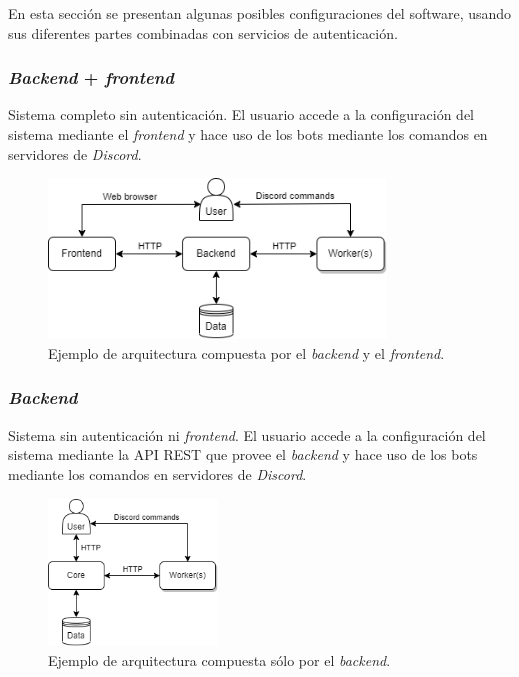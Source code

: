 En esta sección se presentan algunas posibles configuraciones del software, usando sus diferentes partes combinadas con servicios de autenticación.

\subsubsection{\textit{Backend} + \textit{frontend}}

Sistema completo sin autenticación. El usuario accede a la configuración del sistema mediante el \textit{frontend} y hace uso de los bots mediante los comandos en servidores de \textit{Discord}.

\begin{figure}[H]
	\centering
	\includegraphics[width=0.8\textwidth]{img/architecture_with_frontend.png}
	\caption{Ejemplo de arquitectura compuesta por el \textit{backend} y el \textit{frontend}.}
\end{figure}

\subsubsection{\textit{Backend}}

Sistema sin autenticación ni \textit{frontend}. El usuario accede a la configuración del sistema mediante la API REST que provee el \textit{backend} y hace uso de los bots mediante los comandos en servidores de \textit{Discord}.

\begin{figure}[H]
	\centering
	\includegraphics[width=0.4\textwidth]{img/architecture_without_frontend.png}
	\caption{Ejemplo de arquitectura compuesta sólo por el \textit{backend}.}
\end{figure}

